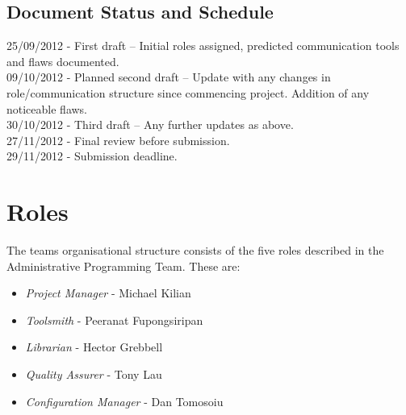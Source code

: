 \documentclass{l3deliverable}
\begin{document}
\subsection{Document Status and Schedule}

25/09/2012 - First draft – Initial roles assigned, predicted communication tools and flaws documented.\\
{\color{red}09/10/2012} - Planned second draft – Update with any changes in role/communication structure since commencing project. Addition of any noticeable flaws.\\
{\color{red}30/10/2012} - Third draft – Any further updates as above.\\
{\color{red}27/11/2012} - Final review before submission.\\
{\color{red}29/11/2012} - Submission deadline.\\


\section{Roles}

The teams organisational structure consists of the five roles described in the Administrative Programming Team\cite{steph}. These are:
\begin{itemize}
\item{\emph{Project Manager} - Michael Kilian}
\item{\emph{Toolsmith} - Peeranat Fupongsiripan}
\item{\emph{Librarian} - Hector Grebbell}
\item{\emph{Quality Assurer} - Tony Lau}
\item{\emph{Configuration Manager} - Dan Tomosoiu}

\end{itemize}
\end{document}

